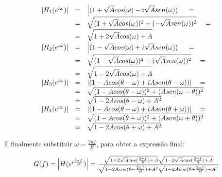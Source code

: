 \[
\begin{array}{l c l}
  |H_1(e^{i\omega})| & = &\displaystyle \left|(1+\sqrt{A}cos(\omega) -i\sqrt{A}sen(\omega))\right| \quad = \\
                     & = & \sqrt{(1+\sqrt{A}cos(\omega))^2+(-\sqrt{A}sen(\omega))^2} \quad = \\
                     & = &\displaystyle \sqrt{1+2\sqrt{A}cos(\omega) + A} \\
  |H_2(e^{i\omega})| & = & \displaystyle \left|(1-\sqrt{A}cos(\omega) +i\sqrt{A}sen(\omega))\right| \quad = \\
                     & = & \sqrt{(1-\sqrt{A}cos(\omega))^2+(\sqrt{A}sen(\omega))^2} \quad = \\
                     & = &\displaystyle \sqrt{1-2\sqrt{A}cos(\omega) + A} \\
  |H_3(e^{i\omega})| & = &\displaystyle \left|(1-Acos(\theta-\omega)+iAsen(\theta-\omega))\right| \quad = \\
                     & = &\displaystyle \sqrt{(1-Acos(\theta-\omega))^2+(Asen(\omega-\theta))^2} \\
                     & = &\displaystyle \sqrt{1-2Acos(\theta-\omega)+A^2} \\
  |H_4(e^{i\omega})| & = &\displaystyle \left|(1-Acos(\theta+\omega)+iAsen(\theta+\omega))\right| \quad = \\
                     & = &\displaystyle \sqrt{(1-Acos(\theta+\omega))^2+(Asen(\omega+\theta))^2} \\
                     & = &\displaystyle \sqrt{1-2Acos(\theta+\omega)+A^2}
\end{array}
\]

E finalmente substituir $\omega = \frac{2 \pi f}{R}$, para obter a expressão final:

\begin{equation}
\begin{array}{l c l c l}
  G(f) = \left| H(e^{i\frac{2 \pi f}{R}}) \right| = \frac{\sqrt{1+2\sqrt{A}cos(\frac{2 \pi f}{R}) + A} \sqrt{1-2\sqrt{A}cos(\frac{2 \pi f}{R}) + A}}{\sqrt{1-2Acos(\theta-\frac{2 \pi f}{R})+A^2}\sqrt{1-2Acos(\theta+\frac{2 \pi f}{R})+A^2}}
\end{array}
\end{equation}



\subsection{}

